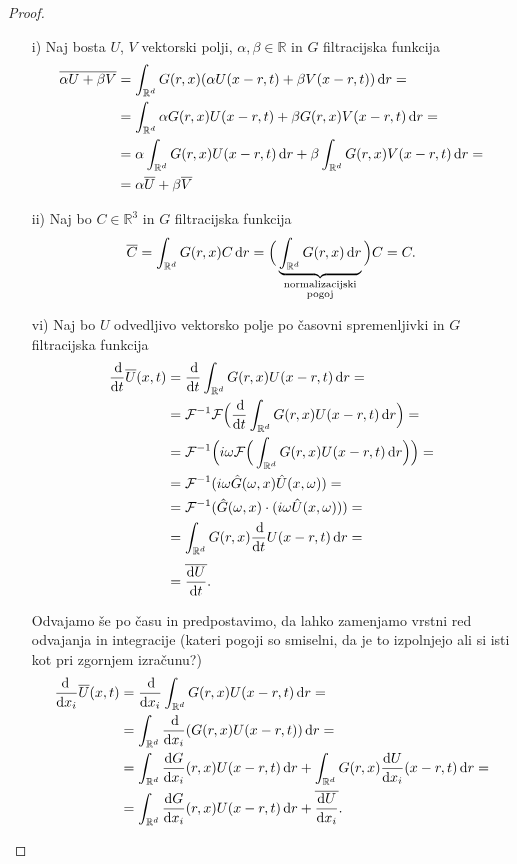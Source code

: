 \documentclass[mat2, tisk]{fmfdelo}
\newcommand{\R}{\mathbb R}
\begin{document}
\begin{proof}
\begin{enumerate}
  \item[i)] Naj bosta $U$, $V$ vektorski polji, $\alpha, \beta \in \R$ in $G$ filtracijska 
  funkcija
  \begin{align*}
  \overline{\alpha U + \beta V} &= \int_{\R^d} G(r, x) (\alpha U(x-r, t) + \beta V(x-r, t)) \dif r = \\
  &= \int_{\R^d} \alpha G(r, x) U(x-r, t) + \beta G(r, x) V(x-r, t) \dif r = \\
  &= \alpha\int_{\R^d} G(r, x) U(x-r, t)\dif r + \beta\int_{\R^d}G(r, x) V(x-r, t) \dif r = \\
  &= \alpha \overline{U} + \beta\overline{V}
  \end{align*}
  \item[ii)] Naj bo $C\in \R^3$ in $G$ filtracijska funkcija
  \begin{align*}
  \overline{C} = \int_{\R^d} G(r, x) C \dif r = \Big(\underbrace{\int_{\R^d} G(r, x)\dif r}_{\substack{\text{normalizacijski}\\\text{pogoj}}}\Big) C = C.
  \end{align*}
  \item[vi)] Naj bo $U$ odvedljivo vektorsko polje po časovni spremenljivki in $G$ filtracijska funkcija 
  \begin{align*}
  \frac{\dif}{\dif t} \overline{U}(x, t) &= \frac{\dif}{\dif t} \int_{\R^d} G(r, x) U(x-r, t) \dif r = \\
  &= \mathcal{F}^{-1}\mathcal{F}\Big(\frac{\dif}{\dif t} \int_{\R^d} G(r, x) U(x-r, t) \dif r\Big)= \\
  &= \mathcal{F}^{-1}\Big(i\omega \mathcal{F}\Big(\int_{\R^d} G(r, x) U(x-r, t) \dif r \Big)\Big)= \\
  &= \mathcal{F}^{-1}(i\omega \hat{G}(\omega, x)\hat{U}(x, \omega)) = \\
  &= \mathcal{F}^{-1}(\hat{G}(\omega, x) \cdot(i\omega \hat{U}(x, \omega))) = \\
  &= \int_{\R^d} G(r, x) \frac{\dif}{\dif t} U(x-r, t) \dif r =\\[1mm]
  &= \overline{\frac{\dif U}{\dif t}}.
  \end{align*}

  Odvajamo še po času in predpostavimo, da lahko zamenjamo vrstni red odvajanja in integracije 
  (kateri pogoji so smiselni, da je to izpolnjejo ali si isti kot pri zgornjem izračunu?) 
  \begin{align*}
  \frac{\!\!\dif}{\dif x_i} \overline{U}(x, t) &= \frac{\dif}{\dif x_i} \int_{\R^d} G(r, x) U(x-r, t) \dif r = \\
  &=  \int_{\R^d} \frac{\dif}{\dif x_i} (G(r, x) U(x-r, t)) \dif r = \\
  &=  \int_{\R^d} \frac{\dif G}{\dif x_i}(r, x)  U(x-r, t) \dif r + \int_{\R^d} G(r, x)  \frac{\dif U}{\dif x_i}(x-r, t) \dif r = \\
  &= \int_{\R^d} \frac{\dif G}{\dif x_i}(r, x)  U(x-r, t) \dif r + \overline{\frac{\dif U}{\dif x_i}}.
  \end{align*}


\end{enumerate}
\end{proof}
\end{document}
